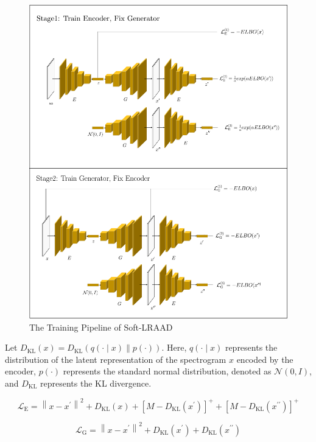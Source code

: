 \documentclass{article}
\begin{document}
\begin{figure}[H]
    \centering
    \includegraphics[width=\textwidth]{./assets/soft_lraad_model.pdf}
    \caption{The Training Pipeline of Soft-LRAAD}
    \label{fig:soft_lraad}
\end{figure}

Let $D_{\mathrm{KL}}(x) = D_{\mathrm{KL}}(q(\cdot \mid x) \| p(\cdot))$. Here, $q(\cdot \mid x)$ represents the distribution of the latent representation of the spectrogram $x$ encoded by the encoder, $p(\cdot)$ represents the standard normal distribution, denoted as $\mathcal{N}(0, I)$, and $D_{\mathrm{KL}}$ represents the KL divergence.

\begin{equation}
  \mathcal{L}_{\mathrm{E}}=\left\|x-x^{\prime}\right\|^2 + D_{\mathrm{KL}}(x) + [M - D_{\mathrm{KL}}(x^\prime)]^{+} + [M - D_{\mathrm{KL}}(x^{\prime\prime})]^{+}
\end{equation}

\begin{equation}
  \mathcal{L}_{\text {G}}= \left\|x-x^{\prime}\right\|^2 + D_\mathrm{KL}(x^\prime) + D_\mathrm{KL}(x^{\prime\prime})
\end{equation}
\end{document}
